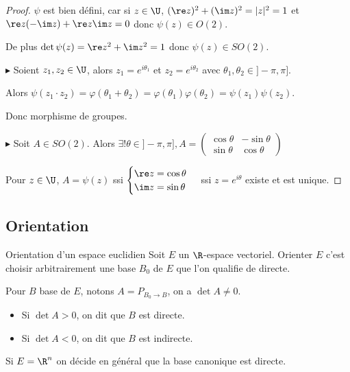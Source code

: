 \begin{proof}
    $\psi$ est bien défini, car si $z \in \U$, 
    $(\re z)^2 + (\im z)^2 = |z|^2 = 1$ et 
    $\re z (- \im z) + \re z \im z = 0$ donc $\psi(z) \in O(2)$. 

    De plus $\det \psi(z) = \re z^2 + \im z ^2 = 1$ donc $\psi(z) \in SO(2)$.

    \lvspace $\blacktriangleright$ Soient $z_1, z_2 \in \U$, alors $z_1 = e^{i \theta_1}$ et $z_2 = e^{i \theta_2}$ avec $\theta_1, \theta_2 \in ]- \pi, \pi]$.

    Alors $\psi(z_1 \cdot z_2) = \varphi(\theta_1 + \theta_2) = \varphi(\theta_1) \varphi(\theta_2) = \psi(z_1) \psi(z_2)$.

    Donc morphisme de groupes. 

    \lvspace $\blacktriangleright$ Soit $A \in SO(2)$. Alors $\exists! \theta \in ]- \pi, \pi], A = \begin{pmatrix}
        \cos \theta & -\sin \theta \\
        \sin \theta & \cos \theta
        \end{pmatrix}$

        Pour $z \in \U$, $A = \psi(z)$ ssi $\begin{cases}
\re z = \cos \theta \\
\im z = \sin \theta
        \end{cases}$ ssi $z = e^{i \theta}$ existe et est unique. 
\end{proof}

\subsection{Orientation}

\begin{definition}{Orientation d'un espace euclidien}{}
    Soit $E$ un $\R$-espace vectoriel. Orienter $E$ c'est choisir arbitrairement 
    une base $B_0$ de $E$ que l'on qualifie de directe. 

    Pour $B$ base de $E$, notons $A = P_{B_0 \to B}$, on a $\det A \neq 0$. 
    \begin{itemize}
        \item Si $\det A > 0$, on dit que $B$ est directe. 
        \item Si $\det A < 0$, on dit que $B$ est indirecte.
    \end{itemize}
    Si $E = \R^n$ on décide en général que la base canonique est directe. 
\end{definition}

